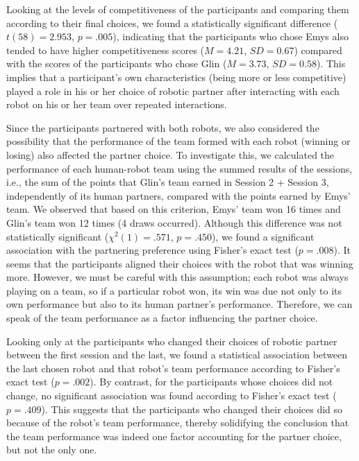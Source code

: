 Looking at the levels of competitiveness of the participants and comparing them according to their final choices, we found a statistically significant difference ($t(58)=2.953$, $p=.005$), indicating that the participants who chose Emys also tended to have higher competitiveness scores ($M=4.21$, $SD=0.67$) compared with the scores of the participants who chose Glin ($M=3.73$, $SD=0.58$). This implies that a participant's own characteristics (being more or less competitive) played a role in his or her choice of robotic partner after interacting with each robot on his or her team over repeated interactions.

Since the participants partnered with both robots, we also considered the possibility that the performance of the team formed with each robot (winning or losing) also affected the partner choice. To investigate this, we calculated the performance of each human-robot team using the summed results of the sessions, i.e., the sum of the points that Glin's team earned in Session 2 + Session 3, independently of its human partners, compared with the points earned by Emys' team. We observed that based on this criterion, Emys' team won 16 times and Glin's team won 12 times (4 draws occurred). Although this difference was not statistically significant (${\chi^2}(1)=.571$, $p=.450$), we found a significant association with the partnering preference using Fisher's exact test ($p=.008$). It seems that the participants aligned their choices with the robot that was winning more. However, we must be careful with this assumption; each robot was always playing on a team, so if a particular robot won, its win was due not only to its own performance but also to its human partner's performance. Therefore, we can speak of the team performance as a factor influencing the partner choice.

Looking only at the participants who changed their choices of robotic partner between the first session and the last, we found a statistical association between the last chosen robot and that robot's team performance according to Fisher's exact test ($p=.002$). By contrast, for the participants whose choices did not change, no significant association was found according to Fisher's exact test ($p=.409$). This suggests that the participants who changed their choices did so because of the robot's team performance,
thereby solidifying the conclusion that the team performance was indeed one factor accounting for the partner choice, but not the only one.
 

